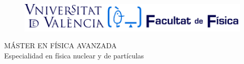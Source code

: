 \begin{titlepage}

\begin{center}
\vspace*{-1in}
\vspace*{1 cm}
\begin{figure}[htb]
\begin{center}
\includegraphics[scale=1]{Logo1.png}
\end{center}
\end{figure}
\vspace*{2 cm}


{\large MÁSTER EN FÍSICA AVANZADA}\\
\vspace*{0.2in}
{\huge Especialidad en física nuclear y de partículas}\\
\vspace*{0.2in}
\vspace*{0.6in}
\end{center}
\vspace*{-1in}
\begin{center}
\vspace*{0.25 cm}



\end{center}
\end{titlepage}
